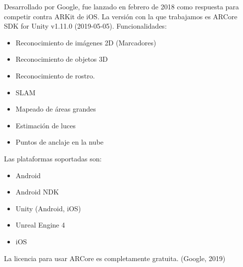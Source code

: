 Desarrollado por Google, fue lanzado en febrero de 2018 como respuesta para competir contra ARKit de iOS. La versión con la que trabajamos es ARCore SDK for Unity v1.11.0 (2019-05-05).
Funcionalidades:
\begin{itemize}
\item Reconocimiento de imágenes 2D (Marcadores)
\item Reconocimiento de objetos 3D
\item Reconocimiento de rostro.
\end{itemize}
\begin{itemize}
\item SLAM
\item Mapeado de áreas grandes
\item Estimación de luces
\item Puntos de anclaje en la nube
\end{itemize}
Las plataformas soportadas son:
\begin{itemize}
\item Android
\item Android NDK
\item Unity (Android, iOS)
\item Unreal Engine 4
\item iOS
\end{itemize}
La licencia para usar ARCore es completamente gratuita. (Google, 2019)

